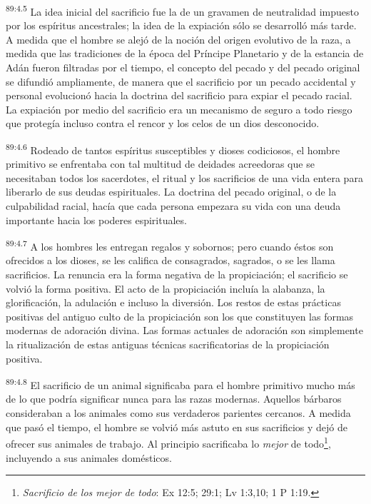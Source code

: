 \documentclass[twoside, 11pt]{book}
\begin{document}
\par
\textsuperscript{89:4.5} La idea inicial del sacrificio fue la de un gravamen de neutralidad impuesto por los espíritus ancestrales; la idea de la expiación sólo se desarrolló más tarde. A medida que el hombre se alejó de la noción del origen evolutivo de la raza, a medida que las tradiciones de la época del Príncipe Planetario y de la estancia de Adán fueron filtradas por el tiempo, el concepto del pecado y del pecado original se difundió ampliamente, de manera que el sacrificio por un pecado accidental y personal evolucionó hacia la doctrina del sacrificio para expiar el pecado racial. La expiación por medio del sacrificio era un mecanismo de seguro a todo riesgo que protegía incluso contra el rencor y los celos de un dios desconocido.

\par
\textsuperscript{89:4.6} Rodeado de tantos espíritus susceptibles y dioses codiciosos, el hombre primitivo se enfrentaba con tal multitud de deidades acreedoras que se necesitaban todos los sacerdotes, el ritual y los sacrificios de una vida entera para liberarlo de sus deudas espirituales. La doctrina del pecado original, o de la culpabilidad racial, hacía que cada persona empezara su vida con una deuda importante hacia los poderes espirituales.

\par
\textsuperscript{89:4.7} A los hombres les entregan regalos y sobornos; pero cuando éstos son ofrecidos a los dioses, se les califica de consagrados, sagrados, o se les llama sacrificios. La renuncia era la forma negativa de la propiciación; el sacrificio se volvió la forma positiva. El acto de la propiciación incluía la alabanza, la glorificación, la adulación e incluso la diversión. Los restos de estas prácticas positivas del antiguo culto de la propiciación son los que constituyen las formas modernas de adoración divina. Las formas actuales de adoración son simplemente la ritualización de estas antiguas técnicas sacrificatorias de la propiciación positiva.

\par
\textsuperscript{89:4.8} El sacrificio de un animal significaba para el hombre primitivo mucho más de lo que podría significar nunca para las razas modernas. Aquellos bárbaros consideraban a los animales como sus verdaderos parientes cercanos. A medida que pasó el tiempo, el hombre se volvió más astuto en sus sacrificios y dejó de ofrecer sus animales de trabajo. Al principio sacrificaba lo \textit{mejor} de todo\footnote{\textit{Sacrificio de los mejor de todo}: Ex 12:5; 29:1; Lv 1:3,10; 1 P 1:19.}, incluyendo a sus animales domésticos.
\end{document}

